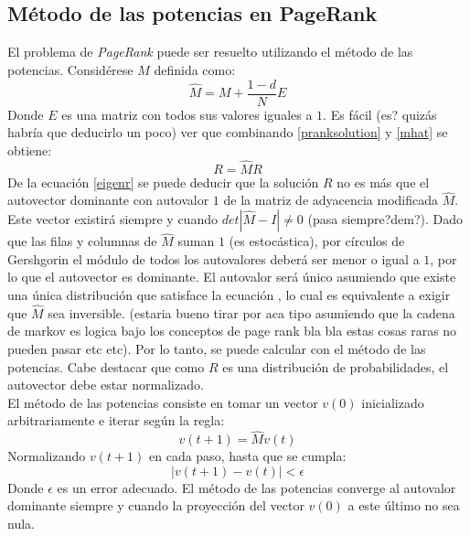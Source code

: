 \documentclass[%
    final,
    reprint,
    notitlepage,
    narroweqnarray,
    inline,
    twoside,
    invited
    ]{ieee}
\begin{document}
\subsection{Método de las potencias en PageRank}
El problema de \textit{PageRank} puede ser resuelto utilizando el método de las potencias. Considérese $\widehat{M}$ definida como:
\begin{equation}\label{mhat}
\widehat{M} = M + \frac{1-d}{N}E
\end{equation}
Donde $E$ es una matriz con todos sus valores iguales a $1$. Es fácil (es? quizás habría que deducirlo un poco) ver que combinando \eqref{pranksolution} 
y \eqref{mhat} se obtiene:
\begin{equation}\label{eigenr}
R = \widehat{M}R
\end{equation}
De la ecuación \eqref{eigenr} se puede deducir que la solución $R$ no es más que el autovector dominante con autovalor $1$ de la matriz de adyacencia 
modificada $\widehat{M}$. Este vector existirá siempre y cuando $det\left|\widehat{M}-I\right| \neq 0 $ (pasa siempre?dem?). Dado que las filas y columnas de 
$\widehat{M}$ suman $1$ (es estocástica), por círculos de Gershgorin el módulo de todos los autovalores deberá ser menor o igual a $1$, por lo que el autovector 
es dominante. El autovalor será único asumiendo que existe una única distribución que satisface la ecuación \label{eigenr}, lo cual es equivalente a exigir 
que $\widehat{M}$ sea inversible. (estaria bueno tirar por aca tipo asumiendo que la cadena de markov es logica bajo los conceptos de page rank bla bla
 estas cosas raras no pueden pasar etc etc).
Por lo tanto, se puede calcular con el método de las potencias. Cabe destacar que como 
$R$ es una distribución de probabilidades, el autovector debe estar normalizado.\\
El método de las potencias 
consiste en tomar un vector $v(0)$ inicializado 
arbitrariamente e iterar según la regla:
\begin{equation}
v(t+1) = \widehat{M}v(t)
\end{equation} 
Normalizando $v(t+1)$ en cada paso, hasta que se cumpla:
\begin{equation}
\left| v(t+1) - v(t) \right| < \epsilon
\end{equation}
Donde $\epsilon$ es un error adecuado. El método de las potencias converge al autovalor dominante siempre y cuando la proyección del vector $v(0)$ a este 
último no sea nula.
\end{document}
